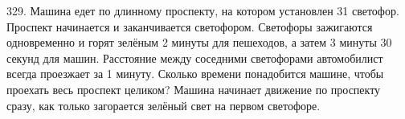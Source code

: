 329. Машина едет по длинному проспекту, на котором установлен 31 светофор. Проспект начинается и заканчивается светофором. Светофоры зажигаются одновременно и горят зелёным 2 минуты для пешеходов, а затем 3 минуты 30 секунд для машин. Расстояние между соседними светофорами автомобилист всегда проезжает за 1 минуту. Сколько времени понадобится машине, чтобы проехать весь проспект целиком? Машина начинает движение по проспекту сразу, как только загорается зелёный свет на первом светофоре.\\
